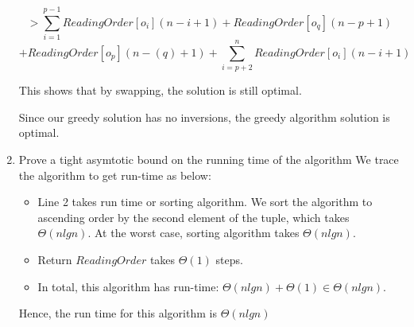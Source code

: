\documentclass{cpsc413Solutions}
\begin{document}
\begin{problemlist}
\begin{problem}
\begin{answer}
\begin{enumerate}
    $$ > \sum_{i=1}^{p-1} ReadingOrder[o_i](n-i+1) +
    ReadingOrder[o_q](n-p+1)$$
    $$+ ReadingOrder[o_p](n-(q)+1) +
    \sum_{i=p+2}^{n} ReadingOrder[o_i](n-i+1)$$
    
    This shows that by swapping, the solution is still optimal.
    
    Since our greedy solution has no inversions, the greedy algorithm solution is optimal.
    
    \item Prove a tight asymtotic bound on the running time of the algorithm
    We trace the algorithm to get run-time as below:
    \begin{itemize}
        \item Line 2 takes run time or sorting algorithm. We sort the algorithm to ascending order by the second element of the tuple, which takes $\Theta(nlgn)$. At the worst case, sorting algorithm takes $\Theta(nlgn)$.
        \item Return $ReadingOrder$ takes $\Theta(1)$ steps.
        \item In total, this algorithm has run-time:
        $\Theta(nlgn)+\Theta(1) \in \Theta(nlgn)$.
        
    \end{itemize}
    Hence, the run time for this algorithm is $\Theta(nlgn)$
    
\end{enumerate}
\end{answer}
\end{problem}

\end{problemlist}
\end{document}
